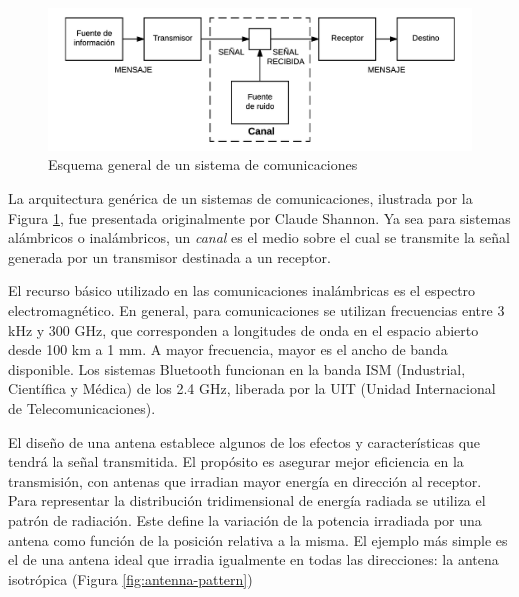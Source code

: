 \begin{figure}[!htp]
\centering
\includegraphics[scale=0.9]{images/comm-system.png}
\caption{Esquema general de un sistema de comunicaciones}
\label{fig:comm-system}
\end{figure}

La arquitectura genérica de un sistemas de comunicaciones, ilustrada por la Figura \ref{fig:comm-system}, fue presentada originalmente por Claude Shannon\cite{shannon2001mathematical}. Ya sea para sistemas alámbricos o inalámbricos, un \textit{canal} es el medio sobre el cual se transmite la señal generada por un transmisor destinada a un receptor. 


El recurso básico utilizado en las comunicaciones inalámbricas es el espectro electromagnético. En general, para comunicaciones se utilizan frecuencias entre 3 kHz y 300 GHz, que corresponden a longitudes de onda en el espacio abierto desde 100 km a 1 mm. A mayor frecuencia, mayor es el ancho de banda disponible.  Los sistemas Bluetooth funcionan en la banda ISM (Industrial, Científica y Médica) de los 2.4 GHz, liberada por la UIT (Unidad Internacional de Telecomunicaciones).

El diseño de una antena establece algunos de los efectos y características que tendrá la señal transmitida. El propósito es asegurar mejor eficiencia en la transmisión, con antenas que irradian mayor energía en dirección al receptor. Para representar la distribución tridimensional de energía radiada se utiliza el patrón de radiación. Este define la variación de la potencia irradiada por una antena como función de la posición relativa a la misma. El ejemplo más simple es el de una antena ideal que irradia igualmente en todas las direcciones: la antena isotrópica (Figura \ref{fig:antenna-pattern})

